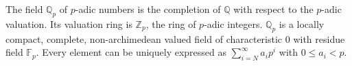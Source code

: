 The field $\mathbb{Q}_p$ of $p$-adic numbers is the completion of $\mathbb{Q}$ with respect to the $p$-adic valuation. Its valuation ring is $\mathbb{Z}_p$, the ring of $p$-adic integers. $\mathbb{Q}_p$ is a locally compact, complete, non-archimedean valued field of characteristic $0$ with residue field $\mathbb{F}_p$. Every element can be uniquely expressed as $\sum_{i=N}^\infty a_i p^i$ with $0 \leq a_i < p$.
